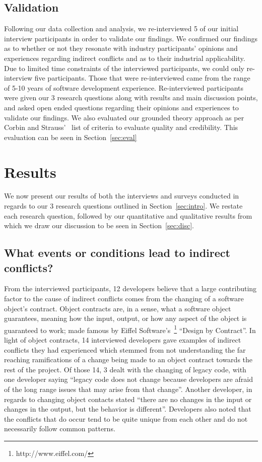 \documentclass[conference]{IEEEtran}
\begin{document}
\subsection{Validation}

Following our data collection and analysis, we re-interviewed 5 of our initial interview participants
in order to validate our findings. We confirmed our findings as to whether or not they resonate with 
industry participants' opinions and experiences regarding indirect conflicts and as to their industrial 
applicability. Due to limited time constraints of the interviewed participants, we could only re-interview
five participants. Those that were re-interviewed came from the range of 5-10 years of software development
experience. Re-interviewed participants were given our 3 research questions along with results and main
discussion points, and asked open ended questions regarding their opinions and experiences to validate our 
findings. We also evaluated our grounded theory approach as per Corbin and Strauss'~\cite{Corbin:1998:SP}
list of criteria to evaluate quality and credibility. This evaluation can be seen in Section~\ref{sec:eval}

\section{Results}
\label{sec:results}

We now present our results of both the interviews and surveys conducted in regards to our 3 research questions
outlined in Section~\ref{sec:intro}. We restate each research question, followed by our quantitative and qualitative
results from which we draw our discussion to be seen in Section~\ref{sec:disc}.

\subsection{What events or conditions lead to indirect conflicts?}

From the interviewed participants, 12 developers believe that a large contributing factor to the cause
of indirect conflicts comes from the changing of a software object's contract. Object contracts are, in a sense,
what a software object guarantees, meaning how the input, output, or how any aspect of the object is guaranteed
to work; made famous by Eiffel Software's~\footnote{http://www.eiffel.com/} ``Design by Contract''\texttrademark. 
In light of object contracts, 14 interviewed developers gave examples of indirect conflicts they had experienced
which stemmed from not understanding the far reaching ramifications of a change being made to an object contract
towards the rest of the project. Of those 14, 3 dealt
with the changing of legacy code, with one developer saying ``legacy code does not change because developers 
are afraid of the long range issues that may arise from that change''. Another developer, in regards to changing
object contacts stated ``there are no changes in the input or changes in the output, but the behavior is different''.
Developers also noted that the conflicts that do occur tend to be quite unique from each other and do not necessarily
follow common patterns.
\end{document}
